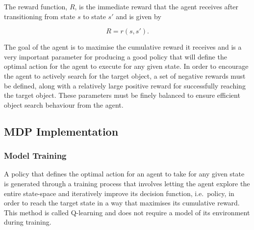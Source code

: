 \documentclass[a4paper, twoside]{article}
\begin{document}
\noindent The reward function, $R$, is the immediate reward that the agent receives after transitioning from state $s$ to state $s'$ and is given by 

\begin{equation}
  R = r(s, s').
\end{equation} 

The goal of the agent is to maximise the cumulative reward it receives and is a very important parameter for producing a good policy that will define the optimal action for the agent to execute for any given state. In order to encourage the agent to actively search for the target object, a set of negative rewards must be defined, along with a relatively large positive reward for successfully reaching the target object. These parameters must be finely balanced to ensure efficient object search behaviour from the agent.



\subsection{MDP Implementation}

\subsubsection{Model Training}

\noindent A policy that defines the optimal action for an agent to take for any given state is generated through a training process that involves letting the agent explore the entire state-space and iteratively improve its decision function, i.e.\ policy, in order to reach the target state in a way that maximises its cumulative reward. This method is called Q-learning and does not require a model of its environment during training. 
\end{document}
